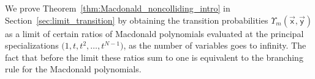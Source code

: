 We prove Theorem~\ref{thm:Macdonald_noncolliding_intro}
in Section~\ref{sec:limit_transition}
by obtaining the transition probabilities
$\Upsilon_m(\vec{\mathsf{x}},\vec{\mathsf{y}})$
as a limit of certain
ratios of Macdonald polynomials
evaluated at the principal specializations
$\big(1,t,t^2,\dots,t^{N-1} \big)$, as the number of variables
goes to infinity. The fact that before the limit
these ratios sum to one is equivalent to the branching
rule for the Macdonald polynomials.
